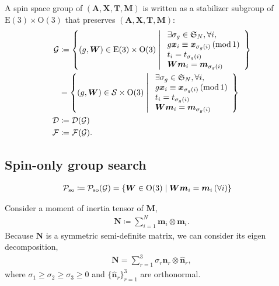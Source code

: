 A spin space group of $(\bm{A}, \bm{X}, \bm{T}, \bm{M})$ is written as a stabilizer subgroup of $\mathrm{E}(3) \times \mathrm{O}(3)$ that preserves $(\bm{A}, \bm{X}, \bm{T}, \bm{M})$:
\begin{align}
  \mathcal{G}
    &\coloneqq \left\{ 
      (g, \bm{W}) \in \mathrm{E}(3) \times \mathrm{O}(3)
     \mathrel{}\middle|\mathrel{} 
        \begin{array}{l}
          \exists \sigma_{g} \in \mathfrak{S}_{N}, \forall i, \\
          g \bm{x}_{i} \equiv \bm{x}_{\sigma_{g}(i)} \, (\mathrm{mod} \, 1) \\
          t_{i} = t_{\sigma_{g}(i)} \\
          \bm{W} \bm{m}_{i} = \bm{m}_{\sigma_{g}(i)}
        \end{array}
     \right\} \\
    &= \left\{ 
      (g, \bm{W}) \in \mathcal{S} \times \mathrm{O}(3)
     \mathrel{}\middle|\mathrel{} 
        \begin{array}{l}
          \exists \sigma_{g} \in \mathfrak{S}_{N}, \forall i, \\
          g \bm{x}_{i} \equiv \bm{x}_{\sigma_{g}(i)} \, (\mathrm{mod} \, 1) \\
          t_{i} = t_{\sigma_{g}(i)} \\
          \bm{W} \bm{m}_{i} = \bm{m}_{\sigma_{g}(i)}
        \end{array}
     \right\} \\
  \mathcal{D} &\coloneqq \mathcal{D}(\mathcal{G}) \\
  \mathcal{F} &\coloneqq \mathcal{F}(\mathcal{G}).
\end{align}

\subsection{Spin-only group search}

\begin{align}
  \mathcal{P}_{\mathrm{so}}
    &\coloneqq \mathcal{P}_{\mathrm{so}}(\mathcal{G})
    = \left\{ 
        \bm{W} \in \mathrm{O}(3)
       \mathrel{}\middle|\mathrel{} 
        \bm{W} \bm{m}_{i} = \bm{m}_{i} \,(\forall i)
       \right\}
\end{align}

Consider a moment of inertia tensor of $\bm{M}$,
\begin{align}
  \bm{N} \coloneqq \sum_{i=1}^{N} \bm{m}_{i} \otimes \bm{m}_{i}.
\end{align}
Because $\bm{N}$ is a symmetric semi-definite matrix, we can consider its eigen decomposition,
\begin{align}
  \bm{N} = \sum_{r=1}^{3} \sigma_{r} \hat{\bm{n}}_{r} \otimes \hat{\bm{n}}_{r},
\end{align}
where $\sigma_{1} \geq \sigma_{2} \geq \sigma_{3} \geq 0$ and $\{ \hat{\bm{n}}_{r} \}_{r=1}^{3}$ are orthonormal.

